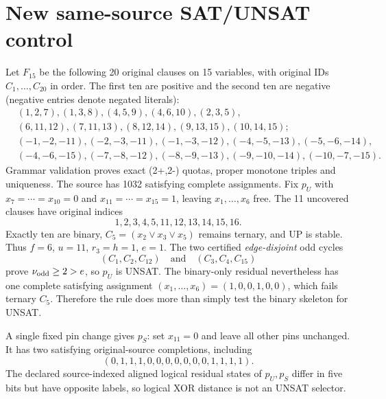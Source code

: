 \documentclass[11pt]{article}
\begin{document}
\section{New same-source SAT/UNSAT control}
Let $F_{15}$ be the following 20 original clauses on 15 variables, with original IDs $C_1,\ldots,C_{20}$ in order. The first ten are positive and the second ten are negative (negative entries denote negated literals):
\[
\begin{split}
& (1,2,7),(1,3,8),(4,5,9),(4,6,10),(2,3,5),\\
& (6,11,12),(7,11,13),(8,12,14),(9,13,15),(10,14,15);\\
& (-1,-2,-11),(-2,-3,-11),(-1,-3,-12),(-4,-5,-13),(-5,-6,-14),\\
& (-4,-6,-15),(-7,-8,-12),(-8,-9,-13),(-9,-10,-14),(-10,-7,-15).
\end{split}
\]
Grammar validation proves exact (2+,2-) quotas, proper monotone triples and uniqueness. The source has 1032 satisfying complete assignments. Fix $p_U$ with $x_7=\cdots=x_{10}=0$ and $x_{11}=\cdots=x_{15}=1$, leaving $x_1,\dots,x_6$ free. The 11 uncovered clauses have original indices
\[
1,2,3,4,5,11,12,13,14,15,16.
\]
Exactly ten are binary, $C_5=(x_2\vee x_3\vee x_5)$ remains ternary, and UP is stable. Thus $f=6$, $u=11$, $r_3=h=1$, $e=1$. The two certified \emph{edge-disjoint} odd cycles
\[
(C_1,C_2,C_{12})\quad\text{and}\quad(C_3,C_4,C_{15})
\]
prove $\nu_{\rm odd}\ge2>e$, so $p_U$ is UNSAT. The binary-only residual nevertheless has one complete satisfying assignment $(x_1,\dots,x_6)=(1,0,0,1,0,0)$, which fails ternary $C_5$. Therefore the rule does more than simply test the binary skeleton for UNSAT.

A single fixed pin change gives $p_S$: set $x_{11}=0$ and leave all other pins unchanged. It has two satisfying original-source completions, including
\[
(0,1,1,1,0,0,0,0,0,0,0,1,1,1,1).
\]
The declared source-indexed aligned logical residual states of $p_U,p_S$ differ in five bits but have opposite labels, so logical XOR distance is not an UNSAT selector.
\end{document}
